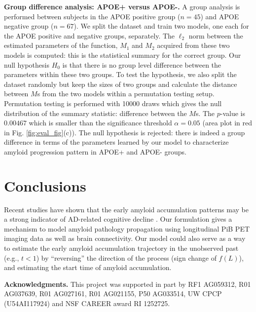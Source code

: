 \documentclass{article}
\begin{document}
\textbf{Group difference analysis: APOE+ versus APOE-.}
A group analysis is performed between subjects in the APOE positive group ($n = 45$) and APOE negative group ($n = 67$). We split the dataset and train two models, one each for the APOE positive and negative groups, separately. The $\ell_2$ norm between the estimated parameters of the function, $M_1$ and $M_2$ acquired from these two models is computed: this is the statistical summary for the correct group. 
Our null hypothesis $H_0$ is that there is no group level difference between the parameters within these two groups. To test the hypothesis, we also split the dataset randomly but keep the sizes of two groups and calculate the distance between $M$s from the two models within a permutation testing setup. Permutation testing is performed with 10000 draws which gives the null distribution of the summary statistic: difference between the $M$s. The $p$-value is $0.00467$ which is smaller than the significance threshold $\alpha=0.05$ (area plot in red in Fig. \ref{fig:eval_fig}(c)). The null hypothesis is rejected: there is indeed a group difference in terms of the parameters learned by our model to characterize amyloid progression pattern in APOE+ and APOE- groups.

\afterpage{\clearpage}

\section{Conclusions}
\label{sec:conclusion}
%
Recent studies have shown that the early amyloid accumulation patterns may be a strong indicator of AD-related cognitive decline \cite{bilgel2016individual,koscik2019modelingpib}. Our formulation gives 
a mechanism to model amyloid pathology propagation using longitudinal PiB PET imaging data as well as brain connectivity. 
Our model could also serve as a way to estimate the early amyloid accumulation trajectory in the unobserved past (e.g., $t<1$) by ``reversing'' the direction of the process (sign change of $f(L)$), and estimating the start time of 
amyloid accumulation. 
%

{\bf Acknowledgments.} This project was supported in part by RF1 AG059312, R01 AG037639, R01 AG027161, R01 AG021155,
P50 AG033514, UW CPCP (U54AI117924) and NSF CAREER award RI 1252725.








\end{document}
